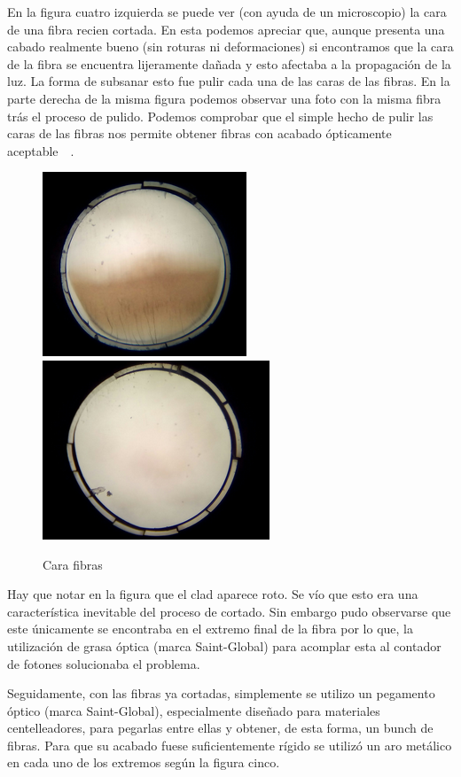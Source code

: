 En la figura cuatro izquierda se puede ver (con ayuda de un microscopio) la cara de una fibra recien cortada. En esta podemos apreciar que, aunque presenta una cabado realmente bueno (sin roturas ni deformaciones) si encontramos que la cara de la fibra se encuentra lijeramente dañada y esto afectaba a la propagación de la luz. La forma de subsanar esto fue pulir cada una de las caras de las fibras. En la parte derecha de la misma figura podemos observar una foto con la misma fibra trás el proceso de pulido. Podemos comprobar que el simple hecho de pulir las caras de las fibras nos permite obtener fibras con acabado ópticamente aceptable~\cite{Alberto}~\cite{manual}.

\begin{figure}[htb]
\centering
{
\includegraphics[scale=0.5]{SinPulir.png} 
}
{
\includegraphics[scale=0.5]{Pulida.png} 
}
\caption{Cara fibras\label{Pulido}}
\end{figure} 

Hay que notar en la figura que el clad aparece roto. Se vío que esto era una característica inevitable del proceso de cortado. Sin embargo pudo observarse que este únicamente se encontraba en el extremo final de la fibra por lo que, la utilización de grasa óptica (marca Saint-Global) para acomplar esta al contador de fotones solucionaba el problema.

Seguidamente, con las fibras ya cortadas, simplemente se utilizo un pegamento óptico (marca Saint-Global), especialmente diseñado para materiales centelleadores, para pegarlas entre ellas y obtener, de esta forma, un bunch de fibras. Para que su acabado fuese suficientemente rígido se utilizó un aro metálico en cada uno de los extremos según la figura cinco.

